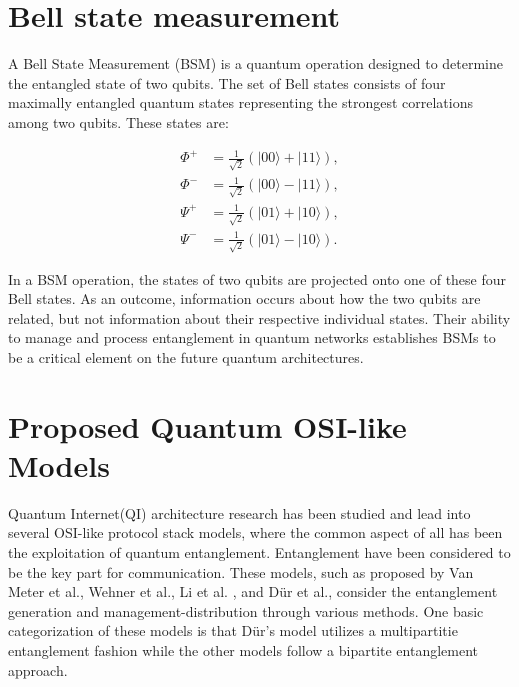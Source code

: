 \documentclass[12pt,a4paper] {report}
\begin{document}
		\section{Bell state measurement}

		A Bell State Measurement (BSM) is a quantum operation designed to determine
		the entangled state of two qubits. The set of Bell states consists of four 
		maximally entangled quantum states representing the strongest correlations
		among two qubits. These states are:

			\begin{align*}
			    \Phi^+ &= \frac{1}{\sqrt{2}} (|00\rangle + |11\rangle), \\
			    \Phi^- &= \frac{1}{\sqrt{2}} (|00\rangle - |11\rangle), \\
			    \Psi^+ &= \frac{1}{\sqrt{2}} (|01\rangle + |10\rangle), \\
			    \Psi^- &= \frac{1}{\sqrt{2}} (|01\rangle - |10\rangle).
			\end{align*}

		In a BSM operation, the states of two qubits are projected onto one of these four Bell states. 
		As an outcome, information occurs about how the two qubits are related, but not information
		about their respective individual states. Their ability to manage and process entanglement
		in quantum networks establishes BSMs to be a critical element on the future quantum architectures. 


		\section{Proposed Quantum OSI-like Models}
		
		Quantum Internet(QI) architecture research has been studied and lead into several OSI-like protocol 
		stack models, where the common aspect of all has been the exploitation of
		quantum entanglement. Entanglement have been considered to be the key part for communication. 
		These models, such as proposed by Van Meter et al.\cite{quantum-arch}, 
		Wehner et al.\cite{wehner-arch}, Li et al. \cite{li-arch}, and Dür et al.\cite{dur-multipartite}, 
		consider the entanglement generation and management-distribution through various methods.
		One basic categorization of these models is that Dür's model utilizes a multipartitie entanglement fashion
		while the other models follow a bipartite entanglement approach.
		
\end{document}
